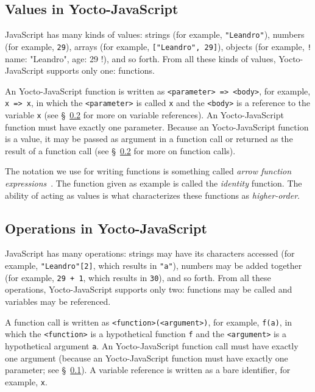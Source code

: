 \documentclass[12pt, oneside]{book}
\begin{document}
\subsection{Values in Yocto-JavaScript}
\label{Values in Yocto-JavaScript}

JavaScript has many kinds of values: strings (for example, \texttt{"Leandro"}), numbers (for example, \texttt{29}), arrays (for example, \texttt{["Leandro", 29]}), objects (for example, \texttt!{ name: "Leandro", age: 29 }!), and so forth. From all these kinds of values, Yocto-JavaScript supports only one: functions.

An Yocto-JavaScript function is written as \texttt{<parameter> => <body>}, for example, \texttt{x => x}, in which the \texttt{<parameter>} is called \texttt{x} and the \texttt{<body>} is a reference to the variable \texttt{x} (see §~\ref{Operations in Yocto-JavaScript} for more on variable references). An Yocto-JavaScript function must have exactly one parameter. Because an Yocto-JavaScript function is a value, it may be passed as argument in a function call or returned as the result of a function call (see §~\ref{Operations in Yocto-JavaScript} for more on function calls).

\begin{mdframed}[frametitle = {Technical Terms}]
The notation we use for writing functions is something called \emph{arrow function expressions}~\cite{arrow-function-expressions}. The function given as example is called the \emph{identity} function. The ability of acting as values is what characterizes these functions as \emph{higher-order}.
\end{mdframed}

\subsection{Operations in Yocto-JavaScript}
\label{Operations in Yocto-JavaScript}

JavaScript has many operations: strings may have its characters accessed (for example, \texttt{"Leandro"[2]}, which results in \texttt{"a"}), numbers may be added together (for example, \texttt{29 + 1}, which results in \texttt{30}), and so forth. From all these operations, Yocto-JavaScript supports only two: functions may be called and variables may be referenced.

A function call is written as \texttt{<function>(<argument>)}, for example, \texttt{f(a)}, in which the \texttt{<function>} is a hypothetical function \texttt{f} and the \texttt{<argument>} is a hypothetical argument \texttt{a}. An Yocto-JavaScript function call must have exactly one argument (because an Yocto-JavaScript function must have exactly one parameter; see §~\ref{Values in Yocto-JavaScript}). A variable reference is written as a bare identifier, for example, \texttt{x}.
\end{document}
